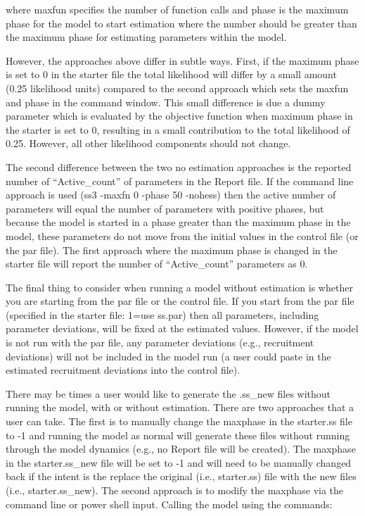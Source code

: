 where maxfun specifies the number of function calls and phase is the maximum phase for the model to start estimation where the number should be greater than the maximum phase for estimating parameters within the model. 

However, the approaches above differ in subtle ways. First, if the maximum phase is set to 0 in the starter file the total likelihood will differ by a small amount (0.25 likelihood units) compared to the second approach which sets the maxfun and phase in the command window. This small difference is due a dummy parameter which is evaluated by the objective function when maximum phase in the starter is set to 0, resulting in a small contribution to the total likelihood of 0.25. However, all other likelihood components should not change.  

The second difference between the two no estimation approaches is the reported number of ``Active\_count'' of parameters in the Report file. If the command line approach is used (ss3 -maxfn 0 -phase 50 -nohess) then the active number of parameters will equal the number of parameters with positive phases, but because the model is started in a phase greater than the maximum phase in the model, these parameters do not move from the initial values in the control file (or the par file). The first approach where the maximum phase is changed in the starter file will report the number of ``Active\_count'' parameters as 0.  

The final thing to consider when running a model without estimation is whether you are starting from the par file or the control file. If you start from the par file (specified in the starter file: 1=use ss.par) then all parameters, including parameter deviations, will be fixed at the estimated values. However, if the model is not run with the par file, any parameter deviations (e.g., recruitment deviations) will not be included in the model run (a user could paste in the estimated recruitment deviations into the control file). 

There may be times a user would like to generate the .ss\_new files without running the model, with or without estimation. There are two approaches that a user can take. The first is to manually change the maxphase in the starter.ss file to -1 and running the model as normal will generate these files without running through the model dynamics (e.g., no Report file will be created). The maxphase in the starter.ss\_new file will be set to -1 and will need to be manually changed back if the intent is the replace the original (i.e., starter.ss) file with the new files (i.e., starter.ss\_new). The second approach is to modify the maxphase via the command line or power shell input. Calling the model using the commands:

